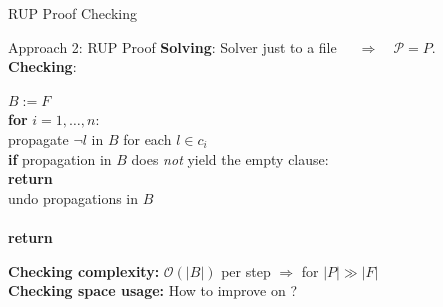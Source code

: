 \documentclass[t,english]{sdqbeamer}
\begin{document}
\begin{frame}{RUP Proof Checking}
	
	\vspace*{-3mm}
	\begin{blueblock}{Approach 2: RUP Proof}
		\textbf{Solving}: Solver just  to a file\ \ \ $\Rightarrow$\ \ $\mathcal{P} = P$.\\
		
		\textbf{Checking}:\\[2mm]
		\hspace*{0.5cm}\begin{minipage}{16cm}
			\beginalgo
			$B := F$\\
			\textbf{for} $i=1,\ldots,n$:\\
			\hspace*{1cm} propagate $\neg l$ in $B$ for each $l \in c_i$ \\
			\hspace*{1cm} \textbf{if} propagation in $B$ does \textit{not} yield the empty clause: \\
			\hspace*{2cm} \textbf{return} \textbf{} \\
			\hspace*{1cm} undo propagations in $B$ \\
			\hspace*{1cm}  \\
			\textbf{return} \textbf{}
			\finishalgo
		\end{minipage}
	\end{blueblock}
	
	\pause
	\vspace*{2mm}
	\textbf{Checking complexity:} \pause $\mathcal{O}(|B|)$ per step $\Rightarrow$  for $|P| \gg |F|$ \\
	\textbf{Checking space usage:} \pause {}
	\hfill How to improve on ?
\end{frame}
\end{document}
